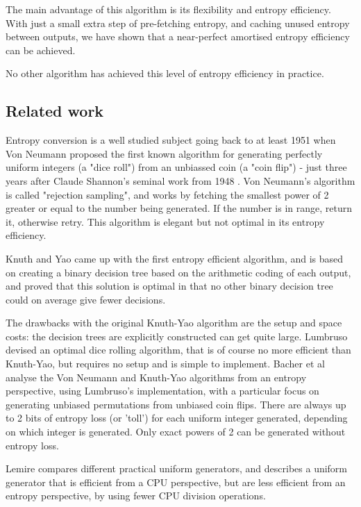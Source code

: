 \documentclass[12pt]{article}
\begin{document}
The main advantage of this algorithm is its flexibility and entropy efficiency. With just a small extra step of pre-fetching entropy, and caching unused entropy between outputs, we have shown that a near-perfect amortised entropy efficiency can be achieved.

No other algorithm has achieved this level of entropy efficiency in practice.

\subsection{Related work}

Entropy conversion is a well studied subject going back to at least 1951 when Von Neumann \cite{neumann51} proposed the first known algorithm for generating perfectly uniform integers (a "dice roll") from an unbiassed coin (a "coin flip") - just three years after Claude Shannon's seminal work from 1948 \cite{shannon1948mathematical}. Von Neumann's algorithm is called "rejection sampling", and works by fetching the smallest power of 2 greater or equal to the number being generated. If the number is in range, return it, otherwise retry. This algorithm is elegant but not optimal in its entropy efficiency.

Knuth and Yao \cite{Knuth1976TheCO} came up with the first entropy efficient algorithm, and is based on creating a binary decision tree based on the arithmetic coding of each output, and proved that this solution is optimal in that no other binary decision tree could on average give fewer decisions.

The drawbacks with the original Knuth-Yao algorithm are the setup and space costs: the decision trees are explicitly constructed can get quite large. Lumbruso \cite{lumbroso2013optimal} devised an optimal dice rolling algorithm, that is of course no more efficient than Knuth-Yao, but requires no setup and is simple to implement. Bacher et al \cite{bacher2017} analyse the Von Neumann and Knuth-Yao algorithms from an entropy perspective, using Lumbruso's implementation, with a particular focus on generating unbiased permutations from unbiased coin flips. There are always up to 2 bits of entropy loss (or 'toll') for each uniform integer generated, depending on which integer is generated. Only exact powers of 2 can be generated without entropy loss.

Lemire \cite{lemire2019fast} compares different practical uniform generators, and describes a uniform generator that is efficient from a CPU perspective, but are less efficient from an entropy perspective, by using fewer CPU division operations.
\end{document}
